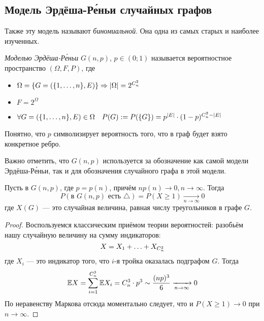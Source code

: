 \subsection{Модель Эрдёша-Р\'{е}ньи случайных графов}

\begin{note}
	Также эту модель называют \textit{биномиальной}. Она одна из самых старых и наиболее изученных.
\end{note}

\begin{definition}
	\textit{Моделью Эрдёша-Р\'{е}ньи} $G(n, p)$, $p \in (0; 1)$ называется вероятностное пространство $(\Omega, F, P)$, где
	\begin{itemize}
		\item \(\Omega = \{G = (\{1, \ldots, n\}, E)\} \Rightarrow |\Omega| = 2^{C_n^2}\)
		
		\item \(F = 2^\Omega\)
		
		\item \(\forall G = (\{1, \ldots, n\}, E) \in \Omega \quad P(G) := P(\{G\}) = p^{|E|} \cdot (1 - p)^{C_n^2 - |E|}\)
	\end{itemize}
\end{definition}

\begin{note}
	Понятно, что $p$ символизирует вероятность того, что в граф будет взято конкретное ребро.
\end{note}

\begin{note}
	Важно отметить, что $G(n, p)$ используется за обозначение как самой модели Эрдёша-Р\'{е}ньи, так и для обозначения случайного графа в этой модели.
\end{note}

\begin{theorem}
	Пусть в $G(n, p)$, где $p = p(n)$, причём $np(n) \to 0, n \to \infty$. Тогда
	\[
		P(\text{в $G(n, p)$ есть } \triangle) = P(X \ge 1) \xrightarrow[n \to \infty]{} 0
	\]
	где $X(G)$ --- это случайная величина, равная числу треугольников в графе $G$.
\end{theorem}

\begin{proof}
	Воспользуемся классическим приёмом теории вероятностей: разобьём нашу случайную величину на сумму индикаторов:
	\[
		X = X_1 + \ldots + X_{C_n^3}
	\]
	где $X_i$ --- это индикатор того, что $i$-я тройка оказалась подграфом $G$. Тогда
	\[
		\mathbb{E} X = \sum_{i = 1}^{C_n^3} \mathbb{E} X_i = C_n^3 \cdot p^3 \sim \frac{(np)^3}{6} \xrightarrow[n \to \infty]{} 0
	\]
	По неравенству Маркова отсюда моментально следует, что и $P(X \ge 1) \to 0$ при $n \to \infty$.
\end{proof}

